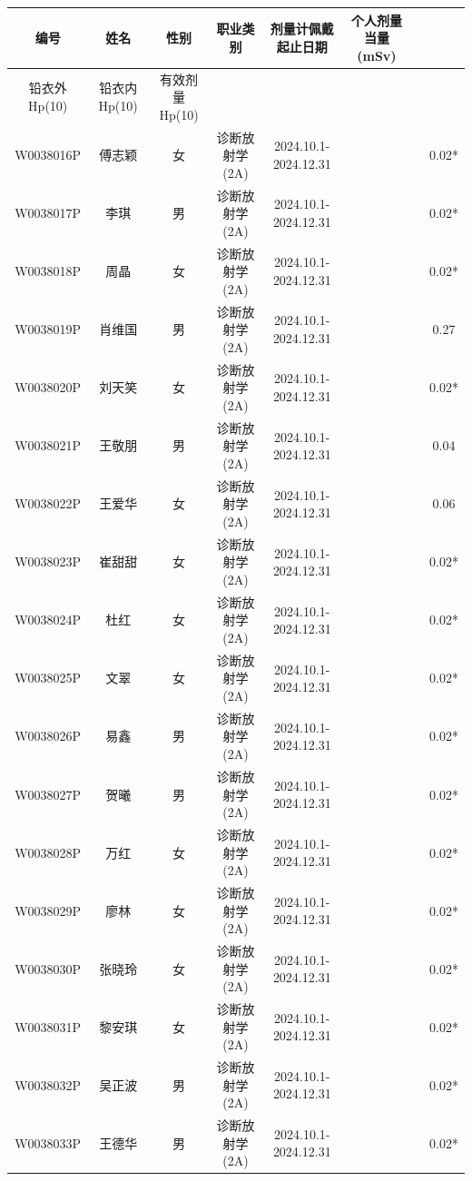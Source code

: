 \begin{table}[H]
\centering
\begin{tabular}{|c|c|c|c|c|c|c|c|}
\hline
编号 & 姓名 & 性别 & 职业类别 & 剂量计佩戴起止日期 & 个人剂量当量(mSv) &  &  \\
\hline
铅衣外Hp(10) & 铅衣内Hp(10) & 有效剂量Hp(10) &  &  &  &  &  \\
\hline
W0038016P & 傅志颖 & 女 & 诊断放射学(2A) & 2024.10.1-2024.12.31 &  &  & 0.02* \\
\hline
W0038017P & 李琪 & 男 & 诊断放射学(2A) & 2024.10.1-2024.12.31 &  &  & 0.02* \\
\hline
W0038018P & 周晶 & 女 & 诊断放射学(2A) & 2024.10.1-2024.12.31 &  &  & 0.02* \\
\hline
W0038019P & 肖维国 & 男 & 诊断放射学(2A) & 2024.10.1-2024.12.31 &  &  & 0.27 \\
\hline
W0038020P & 刘天笑 & 女 & 诊断放射学(2A) & 2024.10.1-2024.12.31 &  &  & 0.02* \\
\hline
W0038021P & 王敬朋 & 男 & 诊断放射学(2A) & 2024.10.1-2024.12.31 &  &  & 0.04 \\
\hline
W0038022P & 王爱华 & 女 & 诊断放射学(2A) & 2024.10.1-2024.12.31 &  &  & 0.06 \\
\hline
W0038023P & 崔甜甜 & 女 & 诊断放射学(2A) & 2024.10.1-2024.12.31 &  &  & 0.02* \\
\hline
W0038024P & 杜红 & 女 & 诊断放射学(2A) & 2024.10.1-2024.12.31 &  &  & 0.02* \\
\hline
W0038025P & 文翠 & 女 & 诊断放射学(2A) & 2024.10.1-2024.12.31 &  &  & 0.02* \\
\hline
W0038026P & 易鑫 & 男 & 诊断放射学(2A) & 2024.10.1-2024.12.31 &  &  & 0.02* \\
\hline
W0038027P & 贺曦 & 男 & 诊断放射学(2A) & 2024.10.1-2024.12.31 &  &  & 0.02* \\
\hline
W0038028P & 万红 & 女 & 诊断放射学(2A) & 2024.10.1-2024.12.31 &  &  & 0.02* \\
\hline
W0038029P & 廖林 & 女 & 诊断放射学(2A) & 2024.10.1-2024.12.31 &  &  & 0.02* \\
\hline
W0038030P & 张晓玲 & 女 & 诊断放射学(2A) & 2024.10.1-2024.12.31 &  &  & 0.02* \\
\hline
W0038031P & 黎安琪 & 女 & 诊断放射学(2A) & 2024.10.1-2024.12.31 &  &  & 0.02* \\
\hline
W0038032P & 吴正波 & 男 & 诊断放射学(2A) & 2024.10.1-2024.12.31 &  &  & 0.02* \\
\hline
W0038033P & 王德华 & 男 & 诊断放射学(2A) & 2024.10.1-2024.12.31 &  &  & 0.02* \\

\end{tabular}
\end{table}
